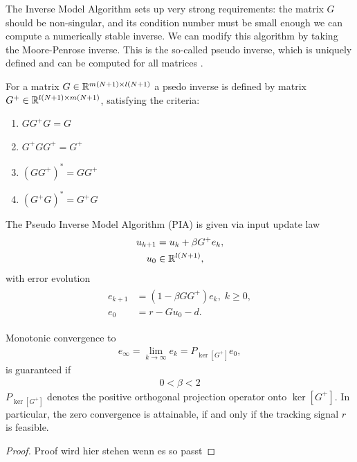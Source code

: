 The Inverse Model Algorithm sets up very strong requirements: the matrix $G$ should be non-singular, and its condition number must be small enough we can compute a numerically stable inverse. 
We can modify this algorithm by taking the Moore-Penrose inverse. This is the so-called pseudo inverse, which is uniquely defined and can be computed for all matrices \cite{LAAG}. 

\begin{defi}
	For a matrix $G \in {\mathbb{R}}^{m(N+1) \times l(N+1)}$ a psedo inverse is defined by matrix $G^+ \in {\mathbb{R}}^{l(N+1) \times m(N+1)}$, satisfying the criteria: 
	\begin{enumerate}
		\item $G G^+ G  = G $
		\item $G^+ G G^+ = G^+$
		\item $(G G^+)^* = G G^+$
		\item $(G^+ G)^* = G^+ G$
	\end{enumerate}
\end{defi}



\begin{alg}
	\label{alg:ILC:PIA}

	The Pseudo Inverse Model Algorithm (PIA) is given via input update law 
	\begin{align}
	\label{eq:ILD:errPIA}
	\begin{split}
	u_{k+1} &= u_k + \beta G^{+} e_k, \\
	u_0 & \in {\mathbb{R}}^{l (N+1)},
	\end{split}	
	\end{align}
	with error evolution
	\begin{align}
	\begin{split}
	e_{k+1} &= (1- \beta G G^+) e_{k}, \; k\geq 0, \\
	e_0 &= r -  Gu_0 -d.
	\end{split}
	\end{align}

	Monotonic convergence to 
	\begin{align}
	\label{eq:ILC:einfPIA} 
	e_\infty  = \lim_{k\to\infty} e_k = P_{\ker[G^+]}e_0,
	\end{align} 
	is guaranteed if
	\begin{align*}
	0 <\beta < 2
	\end{align*}
	$P_{\ker[G^+]}$ denotes the positive orthogonal projection operator onto $\ker[G^+]$.
	In particular, the zero convergence is attainable, if and only if the tracking signal $r$ is feasible.%
\end{alg}
\begin{proof}
Proof wird hier stehen wenn es so passt 
\end{proof}

